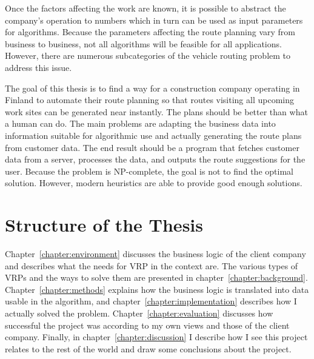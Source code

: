 Once the factors affecting the work are known, it is possible to abstract the company's operation to numbers which in turn can be used as input parameters for algorithms. Because the parameters affecting the route planning vary from business to business, not all algorithms will be feasible for all applications. However, there are numerous subcategories of the vehicle routing problem to address this issue. 

The goal of this thesis is to find a way for a construction company operating in Finland to automate their route planning so that routes visiting all upcoming work sites can be generated near instantly. The plans should be better than what a human can do. The main problems are adapting the business data into information suitable for algorithmic use and actually generating the route plans from customer data. The end result should be a program that fetches customer data from a server, processes the data, and outputs the route suggestions for the user. Because the problem is NP-complete, the goal is not to find the optimal solution. However, modern heuristics are able to provide good enough solutions. 




\section{Structure of the Thesis}
Chapter~\ref{chapter:environment} discusses the business logic of the client company and describes what the needs for VRP in the context are. The various types of VRPs and the ways to solve them are presented in chapter~\ref{chapter:background}. Chapter~\ref{chapter:methods} explains how the business logic is translated into data usable in the algorithm, and chapter~\ref{chapter:implementation} describes how I actually solved the problem. Chapter~\ref{chapter:evaluation} discusses how successful the project was according to my own views and those of the client company. Finally, in chapter~\ref{chapter:discussion} I describe how I see this project relates to the rest of the world and draw some conclusions about the project. 